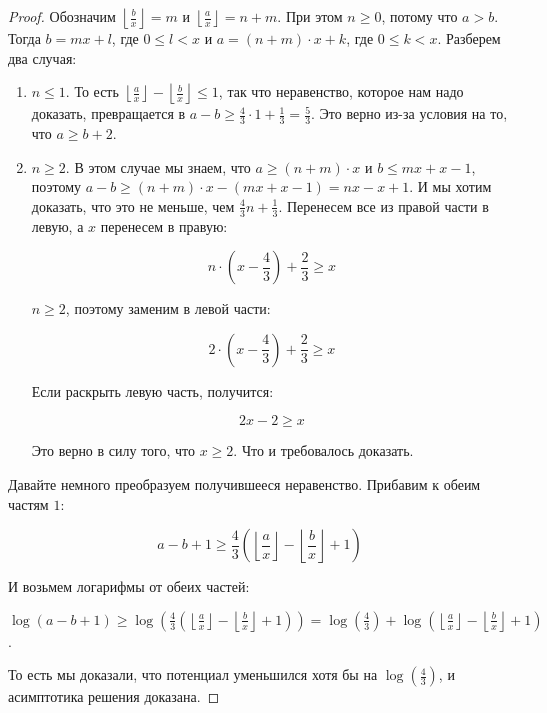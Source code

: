 \begin{proof}
    Обозначим  $\left\lfloor \frac{b}{x} \right\rfloor = m$ и $\left\lfloor \frac{a}{x} \right\rfloor = n + m$. При этом $n \ge 0$, потому что $a > b$.
    Тогда $b = mx + l$, где $0 \le l < x$ и $a = (n + m) \cdot x + k$, где $0 \le k < x$. Разберем два случая:

\begin{enumerate}
    \item $n \le 1$. То есть $\left\lfloor \frac{a}{x} \right\rfloor - \left\lfloor \frac{b}{x} \right\rfloor \le 1$, так что неравенство, которое нам надо доказать, превращается в $a - b \ge \frac{4}{3} \cdot 1 + \frac{1}{3} = \frac{5}{3}$. Это верно из-за условия на то, что $a \ge b + 2$.
    \item $n \ge 2$. В этом случае мы знаем, что $a \ge (n + m) \cdot x$ и $b \le mx + x - 1$, поэтому $a - b \ge (n + m) \cdot x - (mx + x - 1) = nx - x + 1$. И мы хотим доказать, что это не меньше, чем $\frac{4}{3} n + \frac{1}{3}$. Перенесем все из правой части в левую, а $x$ перенесем в правую:

        $$n \cdot \left(x - \frac{4}{3}\right) + \frac{2}{3} \ge x$$

        $n \ge 2$, поэтому заменим в левой части:

        $$2 \cdot \left(x - \frac{4}{3}\right) + \frac{2}{3} \ge x$$

        Если раскрыть левую часть, получится:

        $$2x - 2 \ge x$$

        Это верно в силу того, что $x \ge 2$. Что и требовалось доказать.
\end{enumerate}

Давайте немного преобразуем получившееся неравенство. Прибавим к обеим частям $1$:

$$a - b + 1 \ge \frac{4}{3} \left( \left\lfloor \frac{a}{x} \right\rfloor - \left\lfloor \frac{b}{x} \right\rfloor + 1\right)$$

И возьмем логарифмы от обеих частей:

$\log(a - b + 1) \ge \log \left(\frac{4}{3}  \left( \left\lfloor \frac{a}{x} \right\rfloor - \left\lfloor \frac{b}{x} \right\rfloor + 1\right)\right) = \log (\frac{4}{3}) + \log \left( \left\lfloor \frac{a}{x} \right\rfloor - \left\lfloor \frac{b}{x} \right\rfloor + 1\right)$.

То есть мы доказали, что потенциал уменьшился хотя бы на $\log (\frac{4}{3})$, и асимптотика решения доказана.

\end{proof}







